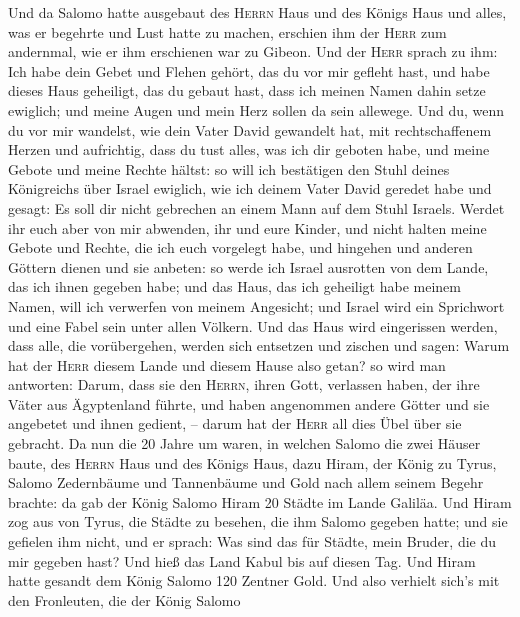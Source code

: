  Und da Salomo hatte ausgebaut des \textsc{Herrn} Haus und
des Königs Haus und alles, was er begehrte und Lust hatte zu machen,
 erschien ihm der \textsc{Herr} zum andernmal, wie er ihm
erschienen war zu Gibeon.  Und der \textsc{Herr} sprach zu
ihm: Ich habe dein Gebet und Flehen gehört, das du vor mir gefleht hast,
und habe dieses Haus geheiligt, das du gebaut hast, dass ich meinen
Namen dahin setze ewiglich; und meine Augen und mein Herz sollen da sein
allewege.  Und du, wenn du vor mir wandelst, wie dein
Vater David gewandelt hat, mit rechtschaffenem Herzen und aufrichtig,
dass du tust alles, was ich dir geboten habe, und meine Gebote und meine
Rechte hältst:  so will ich bestätigen den Stuhl deines
Königreichs über Israel ewiglich, wie ich deinem Vater David geredet
habe und gesagt: Es soll dir nicht gebrechen an einem Mann auf dem Stuhl
Israels.  Werdet ihr euch aber von mir abwenden, ihr und
eure Kinder, und nicht halten meine Gebote und Rechte, die ich euch
vorgelegt habe, und hingehen und anderen Göttern dienen und sie anbeten:
 so werde ich Israel ausrotten von dem Lande, das ich
ihnen gegeben habe; und das Haus, das ich geheiligt habe meinem Namen,
will ich verwerfen von meinem Angesicht; und Israel wird ein Sprichwort
und eine Fabel sein unter allen Völkern.  Und das Haus
wird eingerissen werden, dass alle, die vorübergehen, werden sich
entsetzen und zischen und sagen: Warum hat der \textsc{Herr} diesem
Lande und diesem Hause also getan?  so wird man antworten:
Darum, dass sie den \textsc{Herrn}, ihren Gott, verlassen haben, der
ihre Väter aus Ägyptenland führte, und haben angenommen andere Götter
und sie angebetet und ihnen gedient, -- darum hat der \textsc{Herr} all
dies Übel über sie gebracht.  Da nun die 20 Jahre um
waren, in welchen Salomo die zwei Häuser baute, des \textsc{Herrn} Haus
und des Königs Haus,  dazu Hiram, der König zu Tyrus,
Salomo Zedernbäume und Tannenbäume und Gold nach allem seinem Begehr
brachte: da gab der König Salomo Hiram 20 Städte im Lande Galiläa.
 Und Hiram zog aus von Tyrus, die Städte zu besehen, die
ihm Salomo gegeben hatte; und sie gefielen ihm nicht, 
und er sprach: Was sind das für Städte, mein Bruder, die du mir gegeben
hast? Und hieß das Land Kabul bis auf diesen Tag.  Und
Hiram hatte gesandt dem König Salomo 120 Zentner Gold. 
Und also verhielt sich's mit den Fronleuten, die der König Salomo
